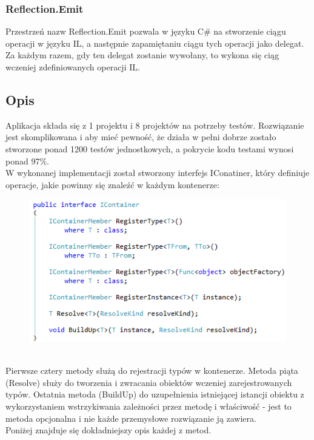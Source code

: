 \documentclass[12pt]{article}
\begin{document}
\subsubsection{Reflection.Emit}
Przestrzeń nazw Reflection.Emit pozwala w języku C\# na stworzenie ciągu operacji w języku IL, a następnie zapamiętaniu ciągu tych operacji jako delegat. Za każdym razem, gdy ten delegat zostanie wywołany, to wykona się ciąg wczeniej zdefiniowanych operacji IL.


\subsection{Opis}
Aplikacja składa się z 1 projektu i 8 projektów na potrzeby testów. Rozwiązanie jest skomplikowana i aby mieć pewność, że działa w pełni dobrze zostało stworzone  ponad 1200 testów jednostkowych, a pokrycie kodu testami wynosi ponad 97\%.\\

W wykonanej implementacji został stworzony interfejs IConatiner, który definiuje operacje, jakie powinny się znaleźć w każdym kontenerze:
\begin{figure}[h]
	\begin{raggedleft}
  		\includegraphics{IContainer.png}
	\end{raggedleft}
\end{figure}\\
Pierwsze cztery metody służą do rejestracji typów w kontenerze. Metoda piąta (Resolve) służy do tworzenia i zwracania obiektów wczeniej zarejestrowanych typów. Ostatnia metoda (BuildUp) do uzupełnienia istniejącej istancji obiektu z wykorzystaniem wstrzykiwania zależności przez metodę i właściwość - jest to metoda opcjonalna i nie każde przemysłowe rozwiązanie ją zawiera.\\
Poniżej znajduje się dokładniejszy opis każdej z metod.
\end{document}
